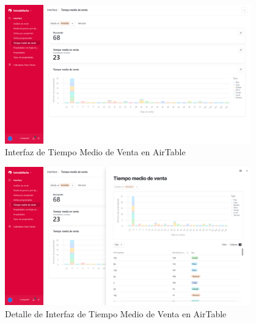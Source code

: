 \begin{enumerate}
    \begin{figure}[H]
        \begin{center}
            \includegraphics[width = 0.95\textwidth]{Figuras/interfazairtabletiempomedioventa.png}
        \end{center}
        \caption{\label{fig:interfazairtabletiempomedioventa} Interfaz de Tiempo Medio de Venta en AirTable}
    \end{figure}

    \begin{figure}[H]
        \begin{center}
            \includegraphics[width = 0.95\textwidth]{Figuras/interfazairtabletiempomedioventadetalle.png}
        \end{center}
        \caption{\label{fig:interfazairtabletiempomedioventadetalle} Detalle de Interfaz de Tiempo Medio de Venta en AirTable}
    \end{figure}


\end{enumerate}
